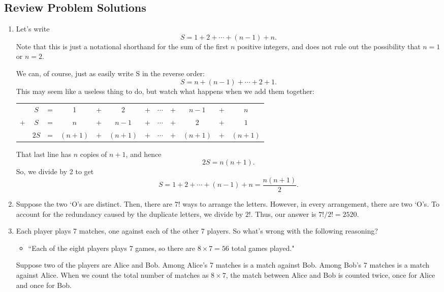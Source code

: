 \documentclass[12pt, letterpaper]{article}
\begin{document}
\newpage
\subsection{Review Problem Solutions}

\begin{enumerate}
    \item Let's write
    $$S=1+2+\cdots+(n-1)+n.$$
    Note that this is just a notational shorthand for the sum of the first $n$ positive integers, and does not rule out the possibility that $n=1$ or $n=2$.
    
    We can, of course, just as easily write S in the reverse order:
    $$S = n+(n-1)+\cdots+2+1.$$
    This may seem like a useless thing to do, but watch what happens when we add them together:
    
    \begin{center}
    \begin{tabular}{cccccccccccc}
          & $S$ & = & 1 & + & 2 & + & $\cdots$ & + & $n-1$ & + & $n$ \\
        + & $S$ & = & $n$ & + & $n-1$ & + & $\cdots$ & + & $2$ & + & $1$ \\
        \hline
          & $2S$ & = & $(n+1)$ & + & $(n+1)$ & + & $\cdots$ & + & $(n+1)$ & + & $(n+1)$ \\
    \end{tabular}
    \end{center}
    
    That last line has $n$ copies of $n+1$, and hence
    $$2S=n(n+1).$$
    So, we divide by 2 to get
    $$S = 1 + 2 + \cdots + (n-1) + n = \frac{n(n+1)}{2}.$$
    \item Suppose the two `O's are distinct. Then, there are $7!$ ways to arrange the letters. However, in every arrangement, there are two `O's. To account for the redundancy caused by the duplicate letters, we divide by $2!$. Thus, our answer is $7!/2!=\boxed{2520}$.
    \item Each player plays 7 matches, one against each of the other 7 players. So what's wrong with the following reasoning?
    \begin{itemize}
        \item ``Each of the eight players plays 7 games, so there are $8\times7=56$ total games played."
    \end{itemize}
    Suppose two of the players are Alice and Bob. Among Alice's 7 matches is a match against Bob. Among Bob's 7 matches is a match against Alice. When we count the total number of matches as $8\times7$, the match between Alice and Bob is counted twice, once for Alice and once for Bob.
    

\end{enumerate}
\end{document}
